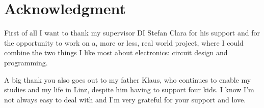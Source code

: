 \chapter{Acknowledgment}

First of all I want to thank my supervisor DI Stefan Clara for his support and for the opportunity to work on a, more
or less, real world project, where I could combine the two things I like most about electronics: circuit design and
programming.

A big thank you also goes out to my father Klaus, who continues to enable my studies and my life in Linz, despite
him having to support four kids.
I know I'm not always easy to deal with and I'm very grateful for your support and love.
